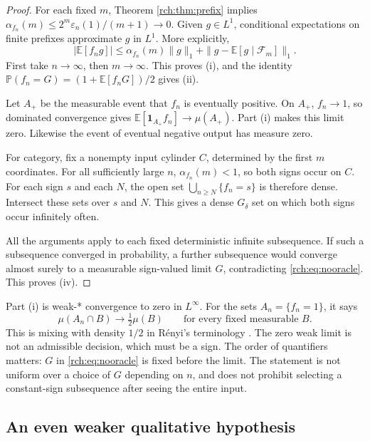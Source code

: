\documentclass[11pt]{article}
\theoremstyle{definition}
\theoremstyle{remark}
\newcommand{\E}{\mathbb E}
\newcommand{\Prb}{\mathbb P}
\newcommand{\cF}{\mathcal F}
\newcommand{\eps}{\varepsilon}
\newcommand{\one}{\mathbf 1}
\begin{document}
\begin{proof}
For each fixed \(m\), Theorem \ref{rch:thm:prefix} implies
\(\alpha_{f_n}(m)\le2^m\eps_n(1)/(m+1)\to0\). Given \(g\in L^1\),
conditional expectations on finite prefixes approximate \(g\) in \(L^1\).
More explicitly,
\begin{equation}
 |\E[f_ng]|
 \le\alpha_{f_n}(m)\|g\|_1
   +\|g-\E[g\mid\cF_m]\|_1.
 \label{rch:eq:L1estimate}
\end{equation}
First take \(n\to\infty\), then \(m\to\infty\). This proves (i), and
the identity \(\Prb(f_n=G)=(1+\E[f_nG])/2\) gives (ii).

Let \(A_+\) be the measurable event that \(f_n\) is eventually positive.
On \(A_+\), \(f_n\to1\), so dominated convergence gives
\(\E[\one_{A_+}f_n]\to\mu(A_+)\). Part (i) makes this limit zero.
Likewise the event of eventual negative output has measure zero.

For category, fix a nonempty input cylinder \(C\), determined by the first
\(m\) coordinates. For all sufficiently large \(n\),
\(\alpha_{f_n}(m)<1\), so both signs occur on \(C\). For each sign \(s\)
and each \(N\), the open set
\(\bigcup_{n\ge N}\{f_n=s\}\) is therefore dense. Intersect these sets
over \(s\) and \(N\). This gives a dense \(G_\delta\) set on which both
signs occur infinitely often.

All the arguments apply to each fixed deterministic infinite subsequence.
If such a subsequence converged in probability, a further subsequence would
converge almost surely to a measurable sign-valued limit \(G\), contradicting
\eqref{rch:eq:nooracle}. This proves (iv).
\end{proof}

Part (i) is weak-* convergence to zero in \(L^\infty\). For the sets
\(A_n=\{f_n=1\}\), it says
\begin{equation}
 \mu(A_n\cap B)\longrightarrow\tfrac12\mu(B)
 \qquad\text{for every fixed measurable }B.
 \label{rch:eq:renyi}
\end{equation}
This is mixing with density \(1/2\) in R\'enyi's terminology \cite{Renyi}.
The zero weak limit is not an admissible decision, which must be a sign.
The order of quantifiers matters: \(G\) in \eqref{rch:eq:nooracle} is fixed before
the limit. The statement is not uniform over a choice of \(G\) depending on
\(n\), and does not prohibit selecting a constant-sign subsequence after seeing
the entire input.

\subsection{An even weaker qualitative hypothesis}
\end{document}

